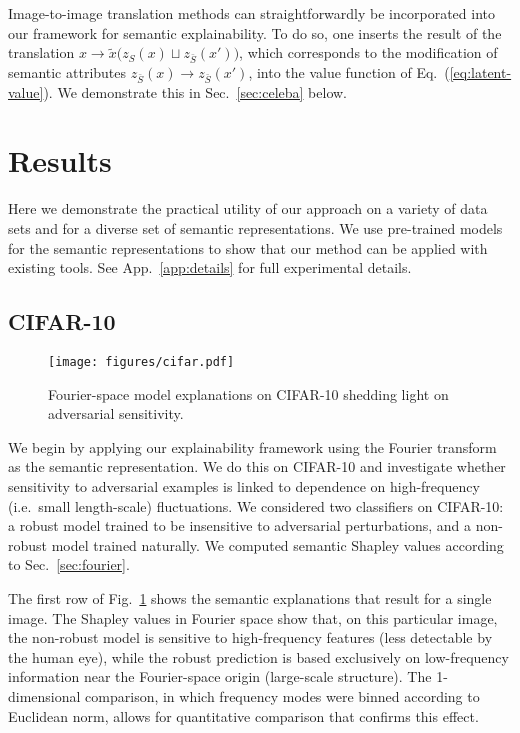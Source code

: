 \documentclass{article}
\DeclareRobustCommand{\Sec}[1]{Sec.~\ref{sec:#1}}
\DeclareRobustCommand{\App}[1]{App.~\ref{app:#1}}
\DeclareRobustCommand{\Fig}[1]{Fig.~\ref{fig:#1}}
\DeclareRobustCommand{\Eq}[1]{Eq.~(\ref{eq:#1})}
\begin{document}
Image-to-image translation methods can straightforwardly be incorporated into our framework for semantic explainability. To do so, one inserts the result of the translation $x \to \tilde x \big(z_S(x) \sqcup z_{\bar S}(x')\big)$, which corresponds to the modification of semantic attributes $z_{\bar S}(x) \to z_{\bar S}(x')$, into the value function of \Eq{latent-value}. We demonstrate this in \Sec{celeba} below.


\section{Results}
\label{sec:results}


Here we demonstrate the practical utility of our approach on a variety of data sets and for a diverse set of semantic representations. We use pre-trained models for the semantic representations to show that our method can be applied with existing tools. See \App{details} for full experimental details.


\subsection{CIFAR-10}
\label{sec:cifar}


\begin{figure}
    \centering
    \texttt{[image: figures/cifar.pdf]}
    \caption{Fourier-space model explanations on CIFAR-10 shedding light on adversarial sensitivity.}
    \label{fig:cifar}
\end{figure}

We begin by applying our explainability framework using the Fourier transform as the semantic representation. We do this on CIFAR-10 \citep{cifar10} and investigate whether sensitivity to adversarial examples \citep{adversarialexamplesdiscovery,adversarialexamplesexplainharness,networkFooling} is linked to dependence on high-frequency (i.e.~small length-scale) fluctuations. We considered two classifiers on CIFAR-10: a robust model \citep{robustPaper,robustness_github} trained to be insensitive to adversarial perturbations, and a non-robust model \citep{resnet} trained naturally. We computed semantic Shapley values according to \Sec{fourier}.

The first row of \Fig{cifar} shows the semantic explanations that result for a single image. The Shapley values in Fourier space show that, on this particular image, the non-robust model is sensitive to high-frequency features (less detectable by the human eye), while the robust prediction is based exclusively on low-frequency information near the Fourier-space origin (large-scale structure). The 1-dimensional comparison, in which frequency modes were binned according to Euclidean norm, allows for quantitative comparison that confirms this effect.
\end{document}
